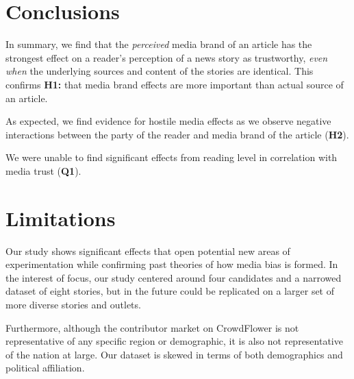 


 

 

\section{Conclusions}
In summary, we find that the \emph{perceived} media brand of an article has the strongest effect on a reader's perception of a news story as trustworthy, \emph{even when} the underlying sources and content of the stories are identical. This confirms \textbf{H1:} that media brand effects are more important than actual source of an article. 

As expected, we find evidence for hostile media effects as we observe negative interactions between the party of the reader and media brand of the article (\textbf{H2}).

We were unable to find significant effects from reading level in correlation with media trust (\textbf{Q1}).


\section{Limitations}

Our study shows significant effects that open potential new areas of experimentation while confirming past theories of how media bias is formed. In the interest of focus, our study centered around four candidates and a narrowed dataset of eight stories, but in the future could be replicated on a larger set of more diverse stories and outlets. 

Furthermore, although the contributor market on CrowdFlower is not representative of any specific region or demographic, it is also not representative of the nation at large. Our dataset is skewed in terms of both demographics and political affiliation.


